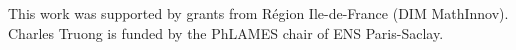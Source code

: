 \documentclass{article}
\begin{document}

\begin{ack}
This work was supported by grants from Région Ile-de-France (DIM MathInnov).
Charles Truong is funded by the PhLAMES chair of ENS Paris-Saclay.
\end{ack}




\newpage





\appendix




\end{document}
